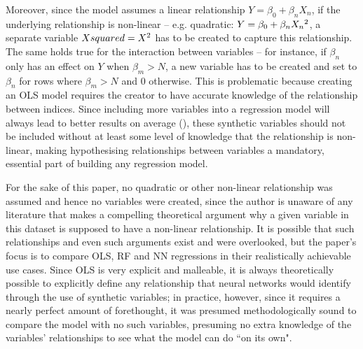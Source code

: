 \documentclass[12pt]{report}
\begin{document}
Moreover, since the model assumes a linear relationship \(Y=\beta_0+\beta_n X_n\), if the underlying relationship is non-linear -- e.g. quadratic: \(Y=\beta_0 + \beta_n X_n\textsuperscript{2}\), a separate variable \(Xsquared=X\textsuperscript{2}\) has to be created to capture this relationship. The same holds true for the interaction between variables -- for instance, if $\beta_n$ only has an effect on $Y$ when $\beta_m>N$, a new variable has to be created and set to $\beta_n$ for rows where $\beta_m>N$ and 0 otherwise. This is problematic because creating an OLS model requires the creator to have accurate knowledge of the relationship between indices. Since including more variables into a regression model will always lead to better results on average (\cite{Aoki2023}), these synthetic variables should not be included without at least some level of knowledge that the relationship is non-linear, making hypothesising relationships between variables a mandatory, essential part of building any regression model.

For the sake of this paper, no quadratic or other non-linear relationship was assumed and hence no variables were created, since the author is unaware of any literature that makes a compelling theoretical argument why a given variable in this dataset is supposed to have a non-linear relationship. It is possible that such relationships and even such arguments exist and were overlooked, but the paper's focus is to compare OLS, RF and NN regressions in their realistically achievable use cases. Since OLS is very explicit and malleable, it is always theoretically possible to explicitly define any relationship that neural networks would identify through the use of synthetic variables; in practice, however, since it requires a nearly perfect amount of forethought, it was presumed methodologically sound to compare the model with no such variables, presuming no extra knowledge of the variables' relationships to see what the model can do ``on its own".
\end{document}
